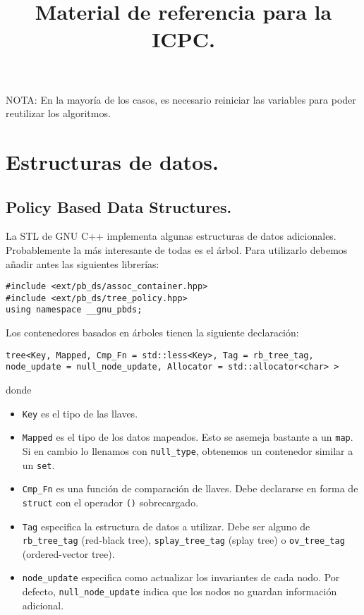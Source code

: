 \documentclass[10pt, letterpaper, twoside]{article}
\title{Material de referencia para la ICPC.}
\author{}
\date{}
\begin{document}
\maketitle

\tableofcontents

\bigskip

\noindent NOTA: En la mayoría de los casos, es necesario reiniciar las variables para poder reutilizar los algoritmos.

\newpage

\section{Estructuras de datos.}

\subsection{Policy Based Data Structures.}

La STL de GNU C++ implementa algunas estructuras de datos adicionales. Probablemente la más interesante de todas es el árbol. Para utilizarlo debemos añadir antes las siguientes librerías:

\begin{lstlisting}
#include <ext/pb_ds/assoc_container.hpp>
#include <ext/pb_ds/tree_policy.hpp>
using namespace __gnu_pbds;
\end{lstlisting}

Los contenedores basados en árboles tienen la siguiente declaración:

\begin{lstlisting}
tree<Key, Mapped, Cmp_Fn = std::less<Key>, Tag = rb_tree_tag, node_update = null_node_update, Allocator = std::allocator<char> >
\end{lstlisting}

donde
\begin{itemize}
\item \texttt{Key} es el tipo de las llaves.

\item \texttt{Mapped} es el tipo de los datos mapeados. Esto se asemeja bastante a un \texttt{map}. Si en cambio lo llenamos con \texttt{null\_type}, obtenemos un contenedor similar a un \texttt{set}.

\item \texttt{Cmp\_Fn} es una función de comparación de llaves. Debe declararse en forma de \texttt{struct} con el operador \texttt{()} sobrecargado.

\item \texttt{Tag} especifica la estructura de datos a utilizar. Debe ser alguno de \texttt{rb\_tree\_tag} (red-black tree), \texttt{splay\_tree\_tag} (splay tree) o \texttt{ov\_tree\_tag} (ordered-vector tree).

\item \texttt{node\_update} especifica como actualizar los invariantes de cada nodo. Por defecto, \texttt{null\_node\_update} indica que los nodos no guardan información adicional.
\end{itemize}
\end{document}
